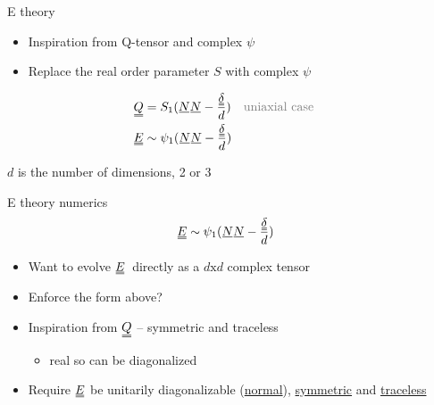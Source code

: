 \documentclass[10pt,notes]{beamer}
\newcommand{\suf}[2]{\stackunder[0.5pt]{\stackunder[1pt]{\ensuremath{#1}}{\rule{\widthof{\ensuremath{#2}}*\real{0.9}}{.1ex}}}{}}
\newcommand{\duf}[2]{\stackunder[0.5pt]{\stackunder[0.8pt]{\stackunder[1pt]{\ensuremath{#1}}{\rule{\widthof{\ensuremath{#2}}*\real{0.9}}{.1ex}}}{\rule{\widthof{\ensuremath{#2}}*\real{0.9}}{.1ex}}}{}}
\newcommand{\su}[1]{\suf{#1}{#1}}
\newcommand{\du}[1]{\duf{#1}{#1}}
\newcommand{\EE}{\ensuremath{\du{E}}}
\begin{document}
\begin{frame}[fragile]{E theory}
    \newrefsection
    \begin{itemize}
        \item Inspiration from Q-tensor and complex $\psi$
        \item Replace the real order parameter $S$ with complex $\psi$
    \end{itemize}
    \begin{align*}
        \du{Q} &= S_1(\su{N}\su{N} - \frac{\du{\delta}}{d}) \qq{\color{gray} uniaxial case \normalcolor} \\
        \du{E} &\sim \psi_1(\su{N}\su{N} - \frac{\du{\delta}}{d})
    \end{align*}

    \vspace{1ex}
    \color{gray} $d$ is the number of dimensions, 2 or 3 \normalcolor
\end{frame}

\begin{frame}[fragile]{E theory numerics}
    \newrefsection
    \begin{align*}
        \du{E} &\sim \psi_1(\su{N}\su{N} - \frac{\du{\delta}}{d})
    \end{align*}
    \begin{itemize}
        \item Want to evolve \EE\ directly as a $d\text{x}d$ complex tensor
        \item Enforce the form above?
        \item Inspiration from $\du{Q}$ -- symmetric and traceless 
        \begin{itemize}
            \item real so can be diagonalized
        \end{itemize}
        \item Require $\du{E}$ be unitarily diagonalizable (\underline{normal}), \underline{symmetric} and \underline{traceless}
    \end{itemize}
\end{frame}
\end{document}
